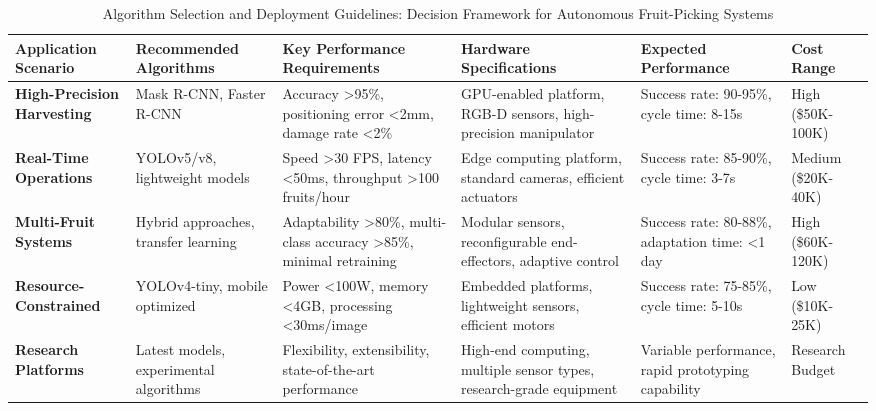 \begin{table*}[htbp]
\centering
\footnotesize
\caption{Algorithm Selection and Deployment Guidelines: Decision Framework for Autonomous Fruit-Picking Systems}
\label{tab:deployment_guidelines}
\begin{tabular}{@{}p{}p{}p{}p{}p{}p{}@{}}
\toprule
\textbf{Application Scenario} & \textbf{Recommended Algorithms} & \textbf{Key Performance Requirements} & \textbf{Hardware Specifications} & \textbf{Expected Performance} & \textbf{Cost Range} \\
\midrule

\textbf{High-Precision Harvesting} & 
Mask R-CNN, Faster R-CNN \cite{yu2019fruit,chu2021deep} & 
Accuracy >95\%, positioning error <2mm, damage rate <2\% & 
GPU-enabled platform, RGB-D sensors, high-precision manipulator & 
Success rate: 90-95\%, cycle time: 8-15s & 
High (\$50K-100K) \\
\midrule

\textbf{Real-Time Operations} & 
YOLOv5/v8, lightweight models \cite{ZHANG2024108836,LU2024108721} & 
Speed >30 FPS, latency <50ms, throughput >100 fruits/hour & 
Edge computing platform, standard cameras, efficient actuators & 
Success rate: 85-90\%, cycle time: 3-7s & 
Medium (\$20K-40K) \\
\midrule

\textbf{Multi-Fruit Systems} & 
Hybrid approaches, transfer learning \cite{bresilla2019single,yu2024object} & 
Adaptability >80\%, multi-class accuracy >85\%, minimal retraining & 
Modular sensors, reconfigurable end-effectors, adaptive control & 
Success rate: 80-88\%, adaptation time: <1 day & 
High (\$60K-120K) \\
\midrule

\textbf{Resource-Constrained} & 
YOLOv4-tiny, mobile optimized \cite{magalhaes2021evaluating,tang2023fruit} & 
Power <100W, memory <4GB, processing <30ms/image & 
Embedded platforms, lightweight sensors, efficient motors & 
Success rate: 75-85\%, cycle time: 5-10s & 
Low (\$10K-25K) \\
\midrule

\textbf{Research Platforms} & 
Latest models, experimental algorithms \cite{ZHOU2024110,ZHANG2024108780} & 
Flexibility, extensibility, state-of-the-art performance & 
High-end computing, multiple sensor types, research-grade equipment & 
Variable performance, rapid prototyping capability & 
Research Budget \\

\bottomrule
\end{tabular}
\end{table*}